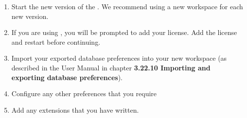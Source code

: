 \begin{enumerate}
\item Start the new version of the \ite{}. We recommend using a new workspace for each new version. 
\item If you are using \gd{}, you will be prompted to add your license. Add the license and restart \gd{} before continuing. 
\item Import your exported database preferences into your new workspace  (as described in the User Manual in chapter \textbf{3.22.10 Importing and exporting database preferences}).
\item Configure any other preferences that you require
\item Add any extensions that you have written. 
\end{enumerate}

